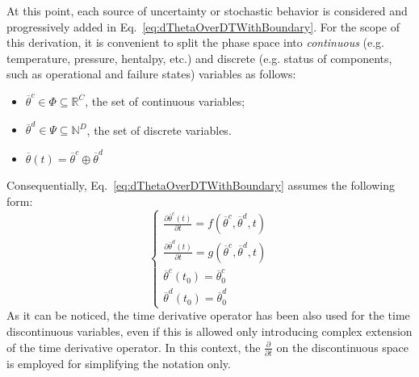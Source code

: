 At this point, each source of uncertainty or stochastic behavior is considered and progressively added in 
Eq.~\ref{eq:dThetaOverDTWithBoundary}.
For the scope of this derivation, it is convenient to split the phase space into \textit{continuous} (e.g. temperature,
pressure, hentalpy, etc.) and discrete (e.g. status of components, such as operational and failure states) variables
as follows: 
\begin{itemize}
 \item $ \overline{\theta}^{c} \in \Phi \subseteq \mathbb{R}^{C}$, the set of continuous variables;
 \item $ \overline{\theta}^{d} \in \Psi \subseteq \mathbb{N}^{D}$, the set of discrete variables.
 \item $\overline{\theta}(t) = \overline{\theta}^{c} \oplus \overline{\theta}^{d}$
\end{itemize}
Consequentially, Eq.~\ref{eq:dThetaOverDTWithBoundary} assumes the following form:
\begin{equation}
\label{eq:systemThetaContAndDescrete}
\left\{\begin{matrix}
\frac{\partial  \overline{\theta}^{c}\left ( t \right )}{\partial t}=f\left ( \overline{\theta}^{c},\overline{\theta}^{d},t \right ) \\ 
\frac{\partial  \overline{\theta}^{d}\left ( t \right )}{\partial t}=g\left ( \overline{\theta}^{c},\overline{\theta}^{d},t \right )\\
 \overline{\theta}^{c}\left ( t_{0} \right ) = \overline{\theta}^{c}_{0}\\
 \overline{\theta}^{d}\left ( t_{0} \right ) = \overline{\theta}^{d}_{0}
\end{matrix}\right.
\end{equation}
As it can be noticed, the time derivative operator has been also used for the time discontinuous variables, even
if this is allowed only introducing complex extension of the time derivative operator. In this context, the $\frac{\partial  }{\partial t}$ on the discontinuous space is employed for simplifying the notation only.

